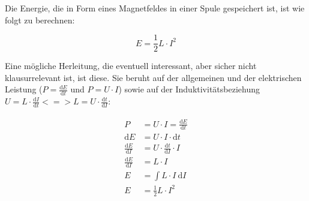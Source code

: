 

Die Energie, die in Form eines Magnetfeldes in einer Spule gespeichert ist, ist wie folgt zu berechnen:

\begin{equation} \label{eq:EnergieSpule}
	E = \frac{1}{2} L \cdot I^2
\end{equation}

Eine mögliche Herleitung, die eventuell interessant, aber sicher nicht klausurrelevant ist, ist diese. Sie beruht auf der allgemeinen und der elektrischen Leistung ($P = \frac{\mathrm{d}E}{\mathrm{d}t}$ und $P = U \cdot I$) sowie auf der Induktivitätsbeziehung $U = L \cdot \frac{\mathrm{d}I}{\mathrm{d}t} <=> L = U \cdot \frac{\mathrm{d}t}{\mathrm{d}I}$:

\begin{align*}
\begin{split}
	P &= U \cdot I = \frac{\mathrm{d}E}{\mathrm{d}t} \\
	\mathrm{d}E &= U \cdot I \cdot \mathrm{d}t \\
	\frac{\mathrm{d}E}{\mathrm{d}I} &= U \cdot \frac{\mathrm{d}t}{\mathrm{d}I} \cdot I \\
	\frac{\mathrm{d}E}{\mathrm{d}I} &= L \cdot I \\
	E &= \int L \cdot I \ \mathrm{d}I \\
	E &= \frac{1}{2}L \cdot I^2
\end{split}
\end{align*}